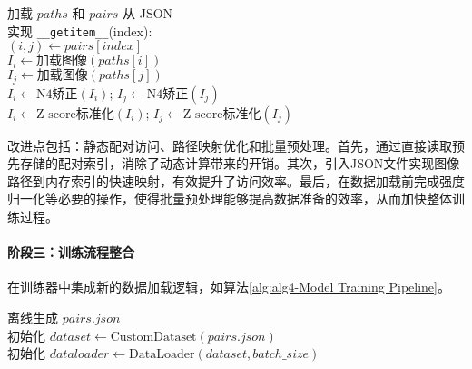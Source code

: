 \begin{algorithm}

    \label{alg:alg3-Data Loading and Preprocessing}

    加载 $paths$ 和 $pairs$ 从 JSON \\
    实现 \texttt{\_\_getitem\_\_}(index): \\
    \Indp
    $(i,j) \gets pairs[index]$ \\
    $I_i \gets \text{加载图像}(paths[i])$ \\
    $I_j \gets \text{加载图像}(paths[j])$ \\
    $I_i \gets \text{N4矫正}(I_i)$; $I_j \gets \text{N4矫正}(I_j)$ \\
    $I_i \gets \text{Z-score标准化}(I_i)$; $I_j \gets \text{Z-score标准化}(I_j)$ \\

\end{algorithm}

改进点包括：静态配对访问、路径映射优化和批量预处理。首先，通过直接读取预先存储的配对索引，消除了动态计算带来的开销。其次，引入JSON文件实现图像路径到内存索引的快速映射，有效提升了访问效率。最后，在数据加载前完成强度归一化等必要的操作，使得批量预处理能够提高数据准备的效率，从而加快整体训练过程。



\paragraph{阶段三：训练流程整合}
在训练器中集成新的数据加载逻辑，如算法\ref{alg:alg4-Model Training Pipeline}。
\begin{algorithm}

    \label{alg:alg4-Model Training Pipeline}

    离线生成 $pairs.json$ \\
    初始化 $dataset \gets \text{CustomDataset}(pairs.json)$ \\
    初始化 $dataloader \gets \text{DataLoader}(dataset, batch\_size)$ \\
\end{algorithm}


